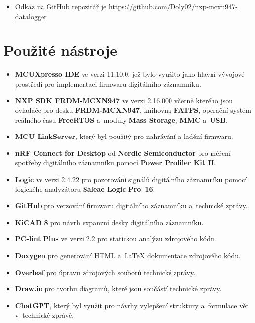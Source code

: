 \begin{itemize}
    \item Odkaz na GitHub repozitář je \url{https://github.com/Doly02/nxp-mcxn947-datalogger}
\end{itemize}
    
\chapter{Použité nástroje}

\begin{itemize}
    \item \textbf{MCUXpresso IDE} ve verzi 11.10.0, jež bylo využito jako hlavní vývojové prostředí pro implementaci firmwaru digitálního záznamníku.
    \item \textbf{NXP SDK FRDM-MCXN947} ve verzi 2.16.000 včetně kterého jsou ovladače pro desku \textbf{FRDM-MCXN947}, knihovna \textbf{FATFS}, operační systém reálného času \textbf{FreeRTOS} a~moduly \textbf{Mass Storage}, \textbf{MMC} a~\textbf{USB}.
    \item \textbf{MCU LinkServer}, který byl použitý pro nahrávání a ladění firmwaru.
    \item \textbf{nRF Connect for Desktop} od \textbf{Nordic Semiconductor} pro měření spotřeby digitálního záznamníku pomocí \textbf{Power Profiler Kit II}.
    \item \textbf{Logic} ve verzi 2.4.22 pro pozorování signálů digitálního záznamníku pomocí logického analyzátoru \textbf{Saleae Logic Pro~16}.
    \item \textbf{GitHub} pro verzování firmwaru digitálního záznamníku a~technické zprávy.
    \item \textbf{KiCAD 8} pro návrh expanzní desky digitálního záznamníku.
    \item \textbf{PC-lint Plus} ve verzi 2.2 pro statickou analýzu zdrojového kódu. 
    \item \textbf{Doxygen} pro generování HTML a~LaTeX dokumentace zdrojového kódu.
    \item \textbf{Overleaf} pro úpravu zdrojových souborů technické zprávy.
    \item \textbf{Draw.io} pro tvorbu diagramů, které jsou součástí technické zprávy.
    \item \textbf{ChatGPT}, který byl využit pro návrhy vylepšení struktury a~formulace vět v~technické zprávě.
\end{itemize}

%
